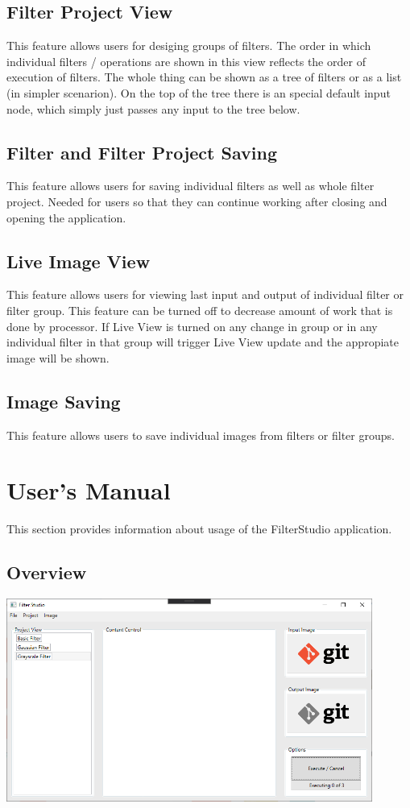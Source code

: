 \documentclass{article}
\begin{document}
\subsection{Filter Project View}
This feature allows users for desiging groups of filters. The order in which individual filters / operations are shown in this view reflects the order of execution of filters. The whole thing can be shown as a tree of filters or as a list (in simpler scenarion). On the top of the tree there is an special default input node, which simply just passes any input to the tree below.


\subsection{Filter and Filter Project Saving} 
This feature allows users for saving individual filters as well as whole filter project. Needed for users so that they can continue working after closing and opening the application.

\subsection{Live Image View}
This feature allows users for viewing last input and output of individual filter or filter group. This feature can be turned off to decrease amount of work that is done by processor. If Live View is turned on any change in group or in any individual filter in that group will trigger Live View update and the appropiate image will be shown.

\subsection{Image Saving}
This feature allows users to save individual images from filters or filter groups.

\newpage
\section{User's Manual}
This section provides information about usage of the FilterStudio application.

\subsection{Overview}

\bigskip
\includegraphics[width=0.9\textwidth]{overview.png}
\end{document}
